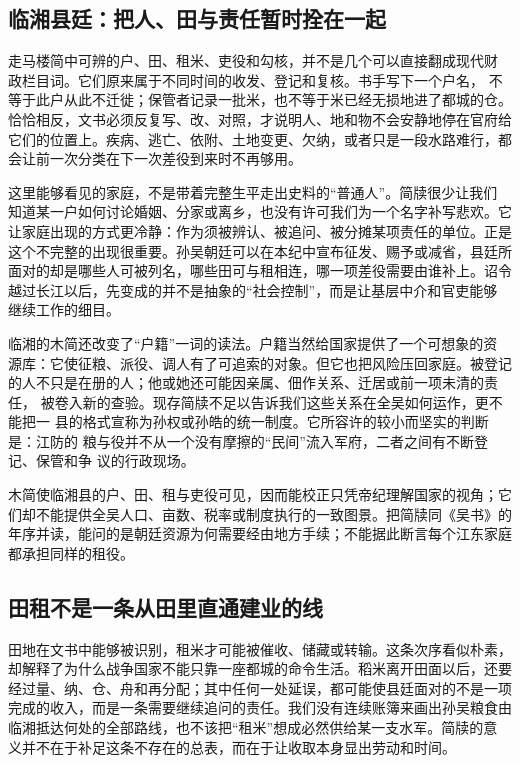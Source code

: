 \subsection{临湘县廷：把人、田与责任暂时拴在一起}

走马楼简中可辨的户、田、租米、吏役和勾核，并不是几个可以直接翻成现代财
政栏目词。它们原来属于不同时间的收发、登记和复核。书手写下一个户名，
不等于此户从此不迁徙；保管者记录一批米，也不等于米已经无损地进了都城的仓。
恰恰相反，文书必须反复写、改、对照，才说明人、地和物不会安静地停在官府给
它们的位置上。疾病、逃亡、依附、土地变更、欠纳，或者只是一段水路难行，都
会让前一次分类在下一次差役到来时不再够用。

这里能够看见的家庭，不是带着完整生平走出史料的“普通人”。简牍很少让我们
知道某一户如何讨论婚姻、分家或离乡，也没有许可我们为一个名字补写悲欢。它
让家庭出现的方式更冷静：作为须被辨认、被追问、被分摊某项责任的单位。正是
这个不完整的出现很重要。孙吴朝廷可以在本纪中宣布征发、赐予或减省，县廷所
面对的却是哪些人可被列名，哪些田可与租相连，哪一项差役需要由谁补上。诏令
越过长江以后，先变成的并不是抽象的“社会控制”，而是让基层中介和官吏能够
继续工作的细目。

临湘的木简还改变了“户籍”一词的读法。户籍当然给国家提供了一个可想象的资
源库：它使征粮、派役、调人有了可追索的对象。但它也把风险压回家庭。被登记
的人不只是在册的人；他或她还可能因亲属、佃作关系、迁居或前一项未清的责任，
被卷入新的查验。现存简牍不足以告诉我们这些关系在全吴如何运作，更不能把一
县的格式宣称为孙权或孙皓的统一制度。它所容许的较小而坚实的判断是：江防的
粮与役并不从一个没有摩擦的“民间”流入军府，二者之间有不断登记、保管和争
议的行政现场。

\begin{sourcenote}
木简使临湘县的户、田、租与吏役可见，因而能校正只凭帝纪理解国家的视角；它
们却不能提供全吴人口、亩数、税率或制度执行的一致图景。把简牍同《吴书》的
年序并读，能问的是朝廷资源为何需要经由地方手续；不能据此断言每个江东家庭
都承担同样的租役。
\end{sourcenote}

\subsection{田租不是一条从田里直通建业的线}

田地在文书中能够被识别，租米才可能被催收、储藏或转输。这条次序看似朴素，
却解释了为什么战争国家不能只靠一座都城的命令生活。稻米离开田面以后，还要
经过量、纳、仓、舟和再分配；其中任何一处延误，都可能使县廷面对的不是一项
完成的收入，而是一条需要继续追问的责任。我们没有连续账簿来画出孙吴粮食由
临湘抵达何处的全部路线，也不该把“租米”想成必然供给某一支水军。简牍的意
义并不在于补足这条不存在的总表，而在于让收取本身显出劳动和时间。

